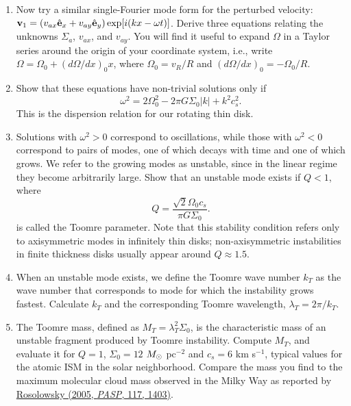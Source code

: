 \begin{enumerate}
\begin{enumerate}
\item Now try a similar single-Fourier mode form for the perturbed velocity: $\mathbf{v}_1 = (v_{ax} \hat{\mathbf{e}}_x + v_{ay} \hat{\mathbf{e}}_y) \exp[i(kx - \omega t)]$. Derive three equations relating the unknowns $\Sigma_a$, $v_{ax}$, and $v_{ay}$. You will find it useful to expand $\Omega$ in a Taylor series around the origin of your coordinate system, i.e., write $\Omega = \Omega_0 + (d\Omega/dx)_0 x$, where $\Omega_0 = v_R/R$ and $(d\Omega/dx)_{0} = -\Omega_0/R$.
\item Show that these equations have non-trivial solutions only if
\begin{displaymath}
\omega^2 = 2 \Omega_0^2 - 2 \pi G \Sigma_0 |k| + k^2 c_s^2.
\end{displaymath}
This is the dispersion relation for our rotating thin disk.
\item Solutions with $\omega^2 > 0$ correspond to oscillations, while those with $\omega^2 < 0$ correspond to pairs of modes, one of which decays with time and one of which grows. We refer to the growing modes as unstable, since in the linear regime they become arbitrarily large. Show that an unstable mode exists if $Q<1$, where
\begin{displaymath}
Q = \frac{\sqrt{2} \Omega_0 c_s}{\pi G \Sigma_0}.
\end{displaymath}
is called the Toomre parameter. Note that this stability condition refers only to axisymmetric modes in infinitely thin disks; non-axisymmetric instabilities in finite thickness disks usually appear around $Q\approx 1.5$.
\item When an unstable mode exists, we define the Toomre wave number $k_T$ as the wave number that corresponds to mode for which the instability grows fastest. Calculate $k_T$ and the corresponding Toomre wavelength, $\lambda_T = 2\pi / k_T$.
\item The Toomre mass, defined as $M_T =  \lambda_T^2 \Sigma_0$, is the characteristic mass of an unstable fragment produced by Toomre instability. Compute $M_T$, and evaluate it for $Q=1$, $\Sigma_0=12$ $M_{\odot}$ pc$^{-2}$ and $c_s = 6$ km s$^{-1}$, typical values for the atomic ISM in the solar neighborhood. Compare the mass you find to the maximum molecular cloud mass observed in the Milky Way as reported by \href{http://adsabs.harvard.edu/abs/2005PASP..117.1403R}{Rosolowsky (2005, {\it PASP}, 117, 1403)}. \nocite{rosolowsky05b}\\
\end{enumerate}


\end{enumerate}
